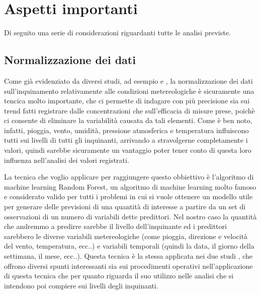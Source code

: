 \documentclass{article}
\begin{document}
\section{Aspetti importanti}
Di seguito una serie di considerazioni riguardanti tutte le analisi previste.
\subsection{Normalizzazione dei dati}
Come già evidenziato da diversi studi, ad esempio \cite{hoogerbrugge2010trends} e \cite{grange2019using}, la normalizzazione dei dati sull'inquinamento relativamente alle condizioni metereologiche è sicuramente una tencica molto importante, che ci permette di indagare con più precisione sia sui trend fatti registrare dalle concentrazioni che sull'efficacia di misure prese, poichè ci consente di eliminare la variabilità causata da tali elementi. Come è ben noto, infatti, pioggia, vento, umidità, pressione atmosferica e temperatura influiscono tutti sui livelli di tutti gli inquinanti, arrivando a stravolgerne completamente i valori, quindi sarebbe sicuramente un vantaggio poter tener conto di questa loro influenza nell'analisi dei valori registrati.

La tecnica che voglio applicare per raggiungere questo obbiettivo è l'algoritmo di machine learning Random Forest, un algoritmo di machine learning molto famoso e considerato valido per tutti i problemi in cui si vuole ottenere un modello utile per generare delle previsioni di una quantità di interesse a partire da un set di osservazioni di un numero di variabili dette predittori. Nel nostro caso la quantità che andremmo a predirre sarebbe il livello dell'inquinante ed i predittori sarebbero le diverse variabili metereologiche (come pioggia, direzione e velocità del vento, temperatura, ecc..) e variabili temporali (quindi la data, il giorno della settimana, il mese, ecc..). Questa tecnica è la stessa applicata nei due studi \cite{grange2019using} \cite{grange2018random}, che offrono diversi spunti interessanti sia sui procedimenti operativi nell'applicazione di questa tecnica che per quanto riguarda il suo utilizzo nelle analisi che si intendono poi compiere sui livelli degli inquinanti.
\end{document}
